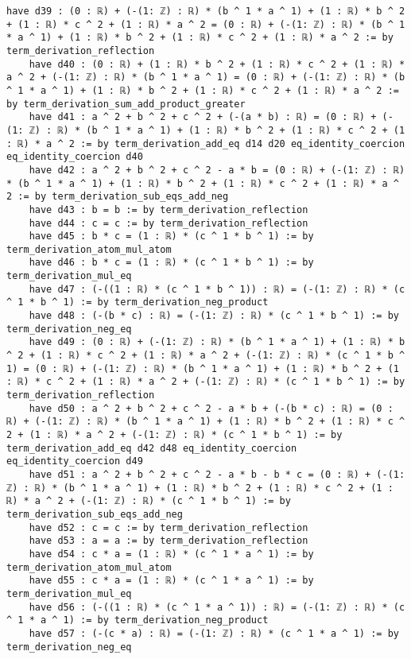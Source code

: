\documentclass{article}
\begin{document}
\begin{tcolorbox}[colback=white!10, width=\linewidth]
\begin{lstlisting}[language=Lean4]
    have d39 : (0 : ℝ) + (-(1: ℤ) : ℝ) * (b ^ 1 * a ^ 1) + (1 : ℝ) * b ^ 2 + (1 : ℝ) * c ^ 2 + (1 : ℝ) * a ^ 2 = (0 : ℝ) + (-(1: ℤ) : ℝ) * (b ^ 1 * a ^ 1) + (1 : ℝ) * b ^ 2 + (1 : ℝ) * c ^ 2 + (1 : ℝ) * a ^ 2 := by term_derivation_reflection
    have d40 : (0 : ℝ) + (1 : ℝ) * b ^ 2 + (1 : ℝ) * c ^ 2 + (1 : ℝ) * a ^ 2 + (-(1: ℤ) : ℝ) * (b ^ 1 * a ^ 1) = (0 : ℝ) + (-(1: ℤ) : ℝ) * (b ^ 1 * a ^ 1) + (1 : ℝ) * b ^ 2 + (1 : ℝ) * c ^ 2 + (1 : ℝ) * a ^ 2 := by term_derivation_sum_add_product_greater
    have d41 : a ^ 2 + b ^ 2 + c ^ 2 + (-(a * b) : ℝ) = (0 : ℝ) + (-(1: ℤ) : ℝ) * (b ^ 1 * a ^ 1) + (1 : ℝ) * b ^ 2 + (1 : ℝ) * c ^ 2 + (1 : ℝ) * a ^ 2 := by term_derivation_add_eq d14 d20 eq_identity_coercion eq_identity_coercion d40
    have d42 : a ^ 2 + b ^ 2 + c ^ 2 - a * b = (0 : ℝ) + (-(1: ℤ) : ℝ) * (b ^ 1 * a ^ 1) + (1 : ℝ) * b ^ 2 + (1 : ℝ) * c ^ 2 + (1 : ℝ) * a ^ 2 := by term_derivation_sub_eqs_add_neg
    have d43 : b = b := by term_derivation_reflection
    have d44 : c = c := by term_derivation_reflection
    have d45 : b * c = (1 : ℝ) * (c ^ 1 * b ^ 1) := by term_derivation_atom_mul_atom
    have d46 : b * c = (1 : ℝ) * (c ^ 1 * b ^ 1) := by term_derivation_mul_eq
    have d47 : (-((1 : ℝ) * (c ^ 1 * b ^ 1)) : ℝ) = (-(1: ℤ) : ℝ) * (c ^ 1 * b ^ 1) := by term_derivation_neg_product
    have d48 : (-(b * c) : ℝ) = (-(1: ℤ) : ℝ) * (c ^ 1 * b ^ 1) := by term_derivation_neg_eq
    have d49 : (0 : ℝ) + (-(1: ℤ) : ℝ) * (b ^ 1 * a ^ 1) + (1 : ℝ) * b ^ 2 + (1 : ℝ) * c ^ 2 + (1 : ℝ) * a ^ 2 + (-(1: ℤ) : ℝ) * (c ^ 1 * b ^ 1) = (0 : ℝ) + (-(1: ℤ) : ℝ) * (b ^ 1 * a ^ 1) + (1 : ℝ) * b ^ 2 + (1 : ℝ) * c ^ 2 + (1 : ℝ) * a ^ 2 + (-(1: ℤ) : ℝ) * (c ^ 1 * b ^ 1) := by term_derivation_reflection
    have d50 : a ^ 2 + b ^ 2 + c ^ 2 - a * b + (-(b * c) : ℝ) = (0 : ℝ) + (-(1: ℤ) : ℝ) * (b ^ 1 * a ^ 1) + (1 : ℝ) * b ^ 2 + (1 : ℝ) * c ^ 2 + (1 : ℝ) * a ^ 2 + (-(1: ℤ) : ℝ) * (c ^ 1 * b ^ 1) := by term_derivation_add_eq d42 d48 eq_identity_coercion eq_identity_coercion d49
    have d51 : a ^ 2 + b ^ 2 + c ^ 2 - a * b - b * c = (0 : ℝ) + (-(1: ℤ) : ℝ) * (b ^ 1 * a ^ 1) + (1 : ℝ) * b ^ 2 + (1 : ℝ) * c ^ 2 + (1 : ℝ) * a ^ 2 + (-(1: ℤ) : ℝ) * (c ^ 1 * b ^ 1) := by term_derivation_sub_eqs_add_neg
    have d52 : c = c := by term_derivation_reflection
    have d53 : a = a := by term_derivation_reflection
    have d54 : c * a = (1 : ℝ) * (c ^ 1 * a ^ 1) := by term_derivation_atom_mul_atom
    have d55 : c * a = (1 : ℝ) * (c ^ 1 * a ^ 1) := by term_derivation_mul_eq
    have d56 : (-((1 : ℝ) * (c ^ 1 * a ^ 1)) : ℝ) = (-(1: ℤ) : ℝ) * (c ^ 1 * a ^ 1) := by term_derivation_neg_product
    have d57 : (-(c * a) : ℝ) = (-(1: ℤ) : ℝ) * (c ^ 1 * a ^ 1) := by term_derivation_neg_eq

\end{lstlisting}
\end{tcolorbox}
\end{document}

